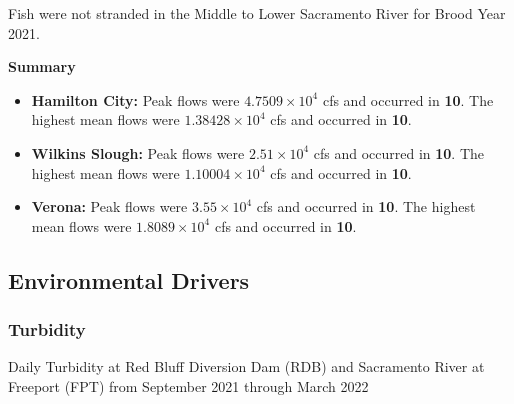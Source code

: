 \documentclass[
]{book}
\theoremstyle{definition}
\theoremstyle{definition}
\theoremstyle{definition}
\theoremstyle{definition}
\theoremstyle{remark}
\begin{document}
Fish were not stranded in the Middle to Lower Sacramento River for Brood Year 2021.

\textbf{Summary}

\begin{itemize}
\item
  \textbf{Hamilton City:} Peak flows were \textbf{\ensuremath{4.7509\times 10^{4}}} cfs and occurred in \textbf{10}. The highest mean flows were \textbf{\ensuremath{1.38428\times 10^{4}}} cfs and occurred in \textbf{10}.
\item
  \textbf{Wilkins Slough:} Peak flows were \textbf{\ensuremath{2.51\times 10^{4}}} cfs and occurred in \textbf{10}. The highest mean flows were \textbf{\ensuremath{1.10004\times 10^{4}}} cfs and occurred in \textbf{10}.
\item
  \textbf{Verona:} Peak flows were \textbf{\ensuremath{3.55\times 10^{4}}} cfs and occurred in \textbf{10}. The highest mean flows were \textbf{\ensuremath{1.8089\times 10^{4}}} cfs and occurred in \textbf{10}.
\end{itemize}

\hypertarget{environmental-drivers-2}{%
\subsection{Environmental Drivers}\label{environmental-drivers-2}}

\hypertarget{turbidity-1}{%
\subsubsection{Turbidity}\label{turbidity-1}}

\label{fig:RDBFPTDO-fig}Daily Turbidity at Red Bluff Diversion Dam (RDB) and Sacramento River at Freeport (FPT) from September 2021 through March 2022
\end{document}
